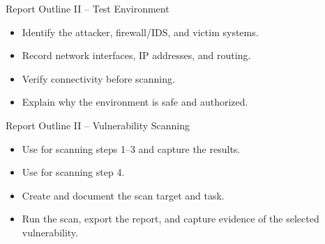 \begin{frame}[t]{Report Outline II -- Test Environment}
\begin{itemize}
  \setlength{\itemsep}{0.23cm}
  \item Identify the attacker, firewall/IDS, and victim systems.
  \item Record network interfaces, IP addresses, and routing.
  \item Verify connectivity before scanning.
  \item Explain why the environment is safe and authorized.
\end{itemize}
\end{frame}

\begin{frame}[t]{Report Outline II -- Vulnerability Scanning}
\begin{itemize}
  \setlength{\itemsep}{0.20cm}
  \item Use  for scanning steps 1--3 and capture the results.
  \item Use  for scanning step 4.
  \item Create and document the scan target and task.
  \item Run the scan, export the report, and capture evidence of the selected vulnerability.
\end{itemize}
\end{frame}
